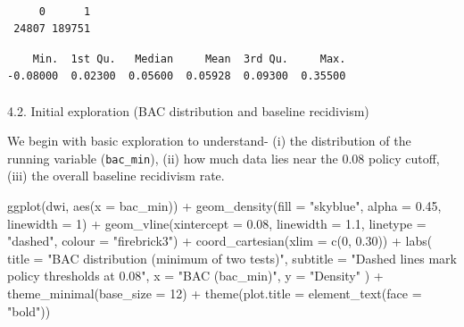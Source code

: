 \documentclass[
  letterpaper,
  DIV=11,
  numbers=noendperiod]{scrartcl}
\makeatletter
\let\oldparagraph\paragraph
\renewcommand{\paragraph}{
    \@ifstar
      \xxxParagraphStar
      \xxxParagraphNoStar
  }
\newcommand{\xxxParagraphStar}[1]{\oldparagraph*{#1}\mbox{}}
\newcommand{\xxxParagraphNoStar}[1]{\oldparagraph{#1}\mbox{}}
\newenvironment{Shaded}{\begin{snugshade}}{\end{snugshade}}
\newcommand{\AttributeTok}[1]{\textcolor[rgb]{0.40,0.45,0.13}{#1}}
\newcommand{\DecValTok}[1]{\textcolor[rgb]{0.68,0.00,0.00}{#1}}
\newcommand{\FloatTok}[1]{\textcolor[rgb]{0.68,0.00,0.00}{#1}}
\newcommand{\FunctionTok}[1]{\textcolor[rgb]{0.28,0.35,0.67}{#1}}
\newcommand{\NormalTok}[1]{\textcolor[rgb]{0.00,0.23,0.31}{#1}}
\newcommand{\SpecialCharTok}[1]{\textcolor[rgb]{0.37,0.37,0.37}{#1}}
\newcommand{\StringTok}[1]{\textcolor[rgb]{0.13,0.47,0.30}{#1}}
\makeatother
\begin{document}
\begin{verbatim}

     0      1 
 24807 189751 
\end{verbatim}

\begin{Shaded}
\end{Shaded}

\begin{verbatim}
    Min.  1st Qu.   Median     Mean  3rd Qu.     Max. 
-0.08000  0.02300  0.05600  0.05928  0.09300  0.35500 
\end{verbatim}

\paragraph{4.2. Initial exploration (BAC distribution and baseline
recidivism)}\label{initial-exploration-bac-distribution-and-baseline-recidivism}

We begin with basic exploration to understand- (i) the distribution of
the running variable (\texttt{bac\_min}), (ii) how much data lies near
the 0.08 policy cutoff, (iii) the overall baseline recidivism rate.

\begin{Shaded}
\begin{Highlighting}[]
\FunctionTok{ggplot}\NormalTok{(dwi, }\FunctionTok{aes}\NormalTok{(}\AttributeTok{x =}\NormalTok{ bac\_min)) }\SpecialCharTok{+}
  \FunctionTok{geom\_density}\NormalTok{(}\AttributeTok{fill =} \StringTok{"skyblue"}\NormalTok{, }\AttributeTok{alpha =} \FloatTok{0.45}\NormalTok{, }\AttributeTok{linewidth =} \DecValTok{1}\NormalTok{) }\SpecialCharTok{+}
  \FunctionTok{geom\_vline}\NormalTok{(}\AttributeTok{xintercept =} \FloatTok{0.08}\NormalTok{, }\AttributeTok{linewidth =} \FloatTok{1.1}\NormalTok{, }\AttributeTok{linetype =} \StringTok{"dashed"}\NormalTok{, }\AttributeTok{colour =} \StringTok{"firebrick3"}\NormalTok{) }\SpecialCharTok{+}
  \FunctionTok{coord\_cartesian}\NormalTok{(}\AttributeTok{xlim =} \FunctionTok{c}\NormalTok{(}\DecValTok{0}\NormalTok{, }\FloatTok{0.30}\NormalTok{)) }\SpecialCharTok{+}
  \FunctionTok{labs}\NormalTok{(}
    \AttributeTok{title =} \StringTok{"BAC distribution (minimum of two tests)"}\NormalTok{,}
    \AttributeTok{subtitle =} \StringTok{"Dashed lines mark policy thresholds at 0.08"}\NormalTok{,}
    \AttributeTok{x =} \StringTok{"BAC (bac\_min)"}\NormalTok{,}
    \AttributeTok{y =} \StringTok{"Density"}
\NormalTok{  ) }\SpecialCharTok{+}
  \FunctionTok{theme\_minimal}\NormalTok{(}\AttributeTok{base\_size =} \DecValTok{12}\NormalTok{) }\SpecialCharTok{+}
  \FunctionTok{theme}\NormalTok{(}\AttributeTok{plot.title =} \FunctionTok{element\_text}\NormalTok{(}\AttributeTok{face =} \StringTok{"bold"}\NormalTok{))}
\end{Highlighting}
\end{Shaded}
\end{document}
